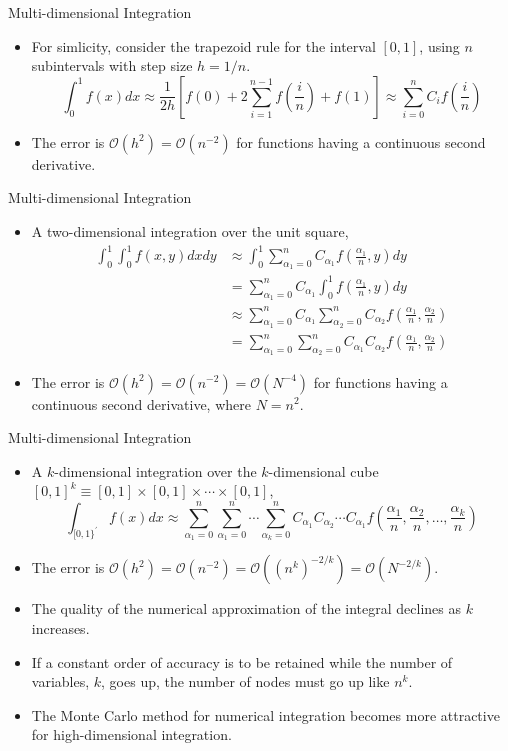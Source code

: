 \documentclass{beamer}
\begin{document}
\begin{frame}{Multi-dimensional Integration}
\begin{itemize}
  \item For simlicity, consider the trapezoid rule for the interval $[0,1]$, using $n$ subintervals with step size $h=1/n$.
  $$
\int_0^1 f(x) d x \approx \frac{1}{2 h}\left[f(0)+2 \sum_{i=1}^{n-1} f\left(\frac{i}{n}\right)+f(1)\right]\approx \sum_{i=0}^n C_i f\left(\frac{i}{n}\right)
$$
\item 
The error is $ \mathcal{O}\left(h^2\right)=\mathcal{O}\left(n^{-2}\right)  $
for functions having a continuous second derivative. 
\end{itemize}
\end{frame}
\begin{frame}{Multi-dimensional Integration}
  \begin{itemize}
    \item A two-dimensional integration over the unit square, 
    $$
\begin{aligned}
\int_0^1 \int_0^1 f(x, y) d x d y & \approx \int_0^1 \sum_{\alpha_1=0}^n C_{\alpha_1} f\left(\frac{\alpha_1}{n}, y\right) d y \\
& =\sum_{\alpha_1=0}^n C_{\alpha_1} \int_0^1 f\left(\frac{\alpha_1}{n}, y\right) d y \\
& \approx \sum_{\alpha_1=0}^n C_{\alpha_1} \sum_{\alpha_2=0}^n C_{\alpha_2} f\left(\frac{\alpha_1}{n}, \frac{\alpha_2}{n}\right) \\
& =\sum_{\alpha_1=0}^n \sum_{\alpha_2=0}^n C_{\alpha_1} C_{\alpha_2} f\left(\frac{\alpha_1}{n}, \frac{\alpha_2}{n}\right)
\end{aligned}
$$
\item The error is  $\mathcal{O}(h^2)=\mathcal{O}(n^{-2})=\mathcal{O}\left(N^{-4}\right)  $ for functions having a continuous second derivative, where $N=n^2$.
  \end{itemize}
\end{frame}

\begin{frame}{Multi-dimensional Integration}
  \begin{itemize}
    \item A $k$-dimensional integration over the 
$k$-dimensional cube $[0,1]^k \equiv[0,1] \times[0,1] \times \cdots \times[0,1]$,
$$
\int_{[0,1\}^{\prime}} f(x) d x \approx \sum_{\alpha_1=0}^n \sum_{\alpha_1=0}^n \cdots \sum_{\alpha_k=0}^n C_{\alpha_1} C_{\alpha_2} \cdots C_{\alpha_1} f\left(\frac{\alpha_1}{n}, \frac{\alpha_2}{n}, \ldots, \frac{\alpha_k}{n}\right)
$$
\item The error is  $\mathcal{O}(h^2)=\mathcal{O}(n^{-2})=\mathcal{O}((n^{k})^{-2/k})=\mathcal{O}\left(N^{-2/k}\right)  $.
\item The quality of the numerical approximation of the integral declines as $k$ increases. 
\item If a constant order of accuracy is to be retained while the number of variables, $k$, goes up, the number of nodes must go up like $n^k$. 
\item The Monte Carlo method for numerical integration becomes more attractive for high-dimensional integration.
  \end{itemize}
\end{frame}
\end{document}
